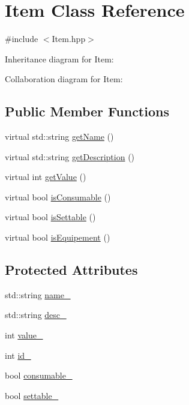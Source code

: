 \hypertarget{classItem}{\section{Item Class Reference}
\label{classItem}
}


{\ttfamily \#include $<$Item.\-hpp$>$}



Inheritance diagram for Item\-:


Collaboration diagram for Item\-:
\subsection*{Public Member Functions}
\begin{DoxyCompactItemize}
\item 
virtual std\-::string \hyperlink{classItem_a63d7f2148b699e539aae354b01559811}{get\-Name} ()
\item 
virtual std\-::string \hyperlink{classItem_a407feeebb6390cc6159920b06e52bcc6}{get\-Description} ()
\item 
virtual int \hyperlink{classItem_a9ceb9a0df0efe18d23e347471f908be7}{get\-Value} ()
\item 
virtual bool \hyperlink{classItem_a44942a9e006dabe24cf800c7206f7716}{is\-Consumable} ()
\item 
virtual bool \hyperlink{classItem_a4b6ebdced0c34d42adb47db18c01190e}{is\-Settable} ()
\item 
virtual bool \hyperlink{classItem_af96f73e5721092411458cea3e93c2057}{is\-Equipement} ()
\end{DoxyCompactItemize}
\subsection*{Protected Attributes}
\begin{DoxyCompactItemize}
\item 
std\-::string \hyperlink{classItem_a5ea323338976e43c1b0e6030f641c9d2}{name\-\_\-}
\item 
std\-::string \hyperlink{classItem_acf30d82ad77e65a0ff0b1f3f1efa8660}{desc\-\_\-}
\item 
int \hyperlink{classItem_aab4eafdc2cc91135a58cd5451af637b3}{value\-\_\-}
\item 
int \hyperlink{classItem_acc4aa0295360f0b035b75cebfa81070a}{id\-\_\-}
\item 
bool \hyperlink{classItem_a3b4e5d71b0d2f5b87598b4a9d9b4c0f0}{consumable\-\_\-}
\item 
bool \hyperlink{classItem_aaca10d54d0fa6e1e090766b81c4a60c9}{settable\-\_\-}
\end{DoxyCompactItemize}


